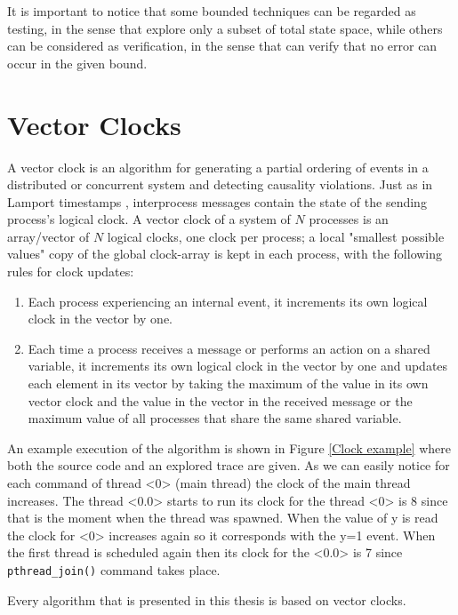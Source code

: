 It is important to notice that some bounded techniques can be regarded as testing, in the sense that explore only a subset of total state space, while
others can be considered as verification, in the sense that can verify that no error can occur in the given bound.

\section{Vector Clocks}

A vector clock is an algorithm for generating a partial ordering of events in a distributed or concurrent system and detecting causality violations. 
Just as in Lamport timestamps \cite{Lamp}, interprocess messages contain the state of the sending process's logical clock. 
A vector clock of a system of $N$ processes is an array/vector of $N$ logical clocks, one clock per process; 
a local "smallest possible values" copy of the global clock-array is kept in each process, with the following rules for clock updates:

\begin{enumerate}
    \item Each process experiencing an internal event, it increments its own logical clock in the vector by one.
    \item Each time a process receives a message or performs an action on a shared variable, it increments its own logical clock in the vector by one and updates each element in its vector 
    by taking the maximum of the value in its own vector clock and the value in the vector in the received message or the maximum value of all processes that share
    the same shared variable.
\end{enumerate}

An example execution of the algorithm is shown in Figure \ref{Clock example} where both the source code and an explored trace are given.
As we can easily notice for each command of thread <0> (main thread) the clock of the main thread increases. The thread <0.0> starts to run its clock for the thread <0> is 8 since 
that is the moment when the thread was spawned. When the value of y is read the clock for <0> increases again so it corresponds with the y=1 event. When the first thread is
scheduled again then its clock for the <0.0> is 7 since \verb|pthread_join()| command takes place.



Every algorithm that is presented in this thesis is based on vector clocks.


